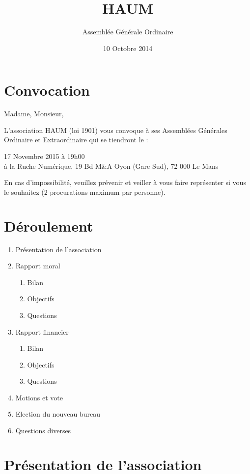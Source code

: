 \documentclass[11pt]{article}
\title{HAUM}
\author{Assemblée Générale Ordinaire}
\date{10 Octobre 2014}
\begin{document}
\maketitle


\section*{Convocation}

Madame, Monsieur, 

L'association HAUM (loi 1901) vous convoque à ses Assemblées Générales Ordinaire et Extraordinaire qui se tiendront le :

\begin{center}
{\Large 17 Novembre 2015 à 19h00}\\
à la Ruche Numérique, 19 Bd M\&A Oyon (Gare Sud), 72 000 Le Mans
\end{center}

En cas d'impossibilité, veuillez prévenir et veiller à vous faire représenter si vous le souhaitez (2 procurations maximum par personne).

\section*{Déroulement}

\begin{enumerate}
    \item Présentation de l'association
    \item Rapport moral
        \begin{enumerate}
            \item Bilan
            \item Objectifs
            \item Questions
        \end{enumerate}
    \item Rapport financier
        \begin{enumerate}
            \item Bilan
            \item Objectifs
            \item Questions
        \end{enumerate}
    \item Motions et vote
    \item Election du nouveau bureau
    \item Questions diverses
\end{enumerate}

\section{Présentation de l'association}
\end{document}
